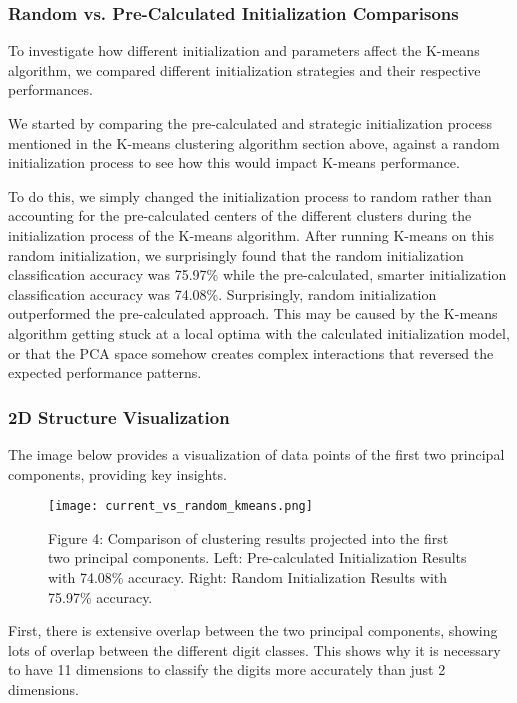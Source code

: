 \documentclass{article}
\begin{document}
\subsubsection{Random vs. Pre-Calculated Initialization Comparisons}

To investigate how different initialization and parameters affect the K-means algorithm, we compared different initialization strategies and their respective performances. 

We started by comparing the pre-calculated and strategic initialization process mentioned in the K-means clustering algorithm section above, against a random initialization process to see how this would impact K-means performance. 

To do this, we simply changed the initialization process to random rather than accounting for the pre-calculated centers of the different clusters during the initialization process of the K-means algorithm. After running K-means on this random initialization, we surprisingly found that the random initialization classification accuracy was 75.97\% while the pre-calculated, smarter initialization classification accuracy was 74.08\%. Surprisingly, random initialization outperformed the pre-calculated approach. This may be caused by the K-means algorithm getting stuck at a local optima with the calculated initialization model, or that the PCA space somehow creates complex interactions that reversed the expected performance patterns. 

\subsubsection{2D Structure Visualization}
The image below provides a visualization of data points of the first two principal components, providing key insights. 

\begin{figure}[H]
  \centering
  \texttt{[image: current\_vs\_random\_kmeans.png]}
  \caption*{Figure 4: Comparison of clustering results projected into the first two principal components. Left: Pre-calculated Initialization Results with 74.08\% accuracy. Right: Random Initialization Results with 75.97\% accuracy.}
\end{figure}

First, there is extensive overlap between the two principal components, showing lots of overlap between the different digit classes. This shows why it is necessary to have 11 dimensions to classify the digits more accurately than just 2 dimensions. 
\end{document}
